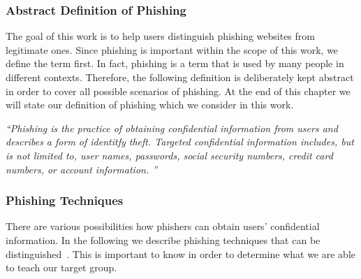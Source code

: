 \subsubsection{Abstract Definition of Phishing}
\label{s:phishing_def}
The goal of this work is to help users distinguish phishing websites from legitimate ones. 
 Since phishing is important within the scope of this work, we define the term first. In fact, phishing is a term that is used by many people in different contexts. Therefore, the following definition is deliberately kept abstract in order to cover all possible scenarios of phishing. At the end of this chapter we will state our definition of phishing which we consider in this work.

\begin{center}
\textit{``Phishing is the practice of obtaining confidential information from users and describes a form of identitfy theft.
 Targeted confidential information includes, but is not limited to, user names, passwords, social security numbers, credit card numbers, or account information.
''}~\cite{jakobsson2006phishing}
\end{center}

\subsubsection{Phishing Techniques}
\label{s:phishing_techs}
There are various possibilities how phishers can obtain users' confidential information.
 In the following we describe phishing techniques that can be distinguished~\cite{jakobsson2006phishing, phishingtechniques}.
 This is important to know in order to determine what we are able to teach our target group.

